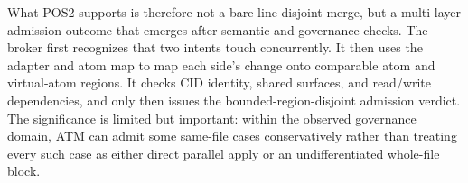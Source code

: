 \documentclass[9pt,letterpaper]{extarticle}
\begin{document}
What POS2 supports is therefore not a bare line-disjoint merge, but a multi-layer admission outcome that emerges after semantic and governance checks. The broker first recognizes that two intents touch \texttt{} concurrently. It then uses the adapter and atom map to map each side's change onto comparable atom and virtual-atom regions. It checks CID identity, shared surfaces, and read/write dependencies, and only then issues the bounded-region-disjoint admission verdict. The significance is limited but important: within the observed governance domain, ATM can admit some same-file cases conservatively rather than treating every such case as either direct parallel apply or an undifferentiated whole-file block.

\begin{figure}[H]



















































\end{figure}
\end{document}
